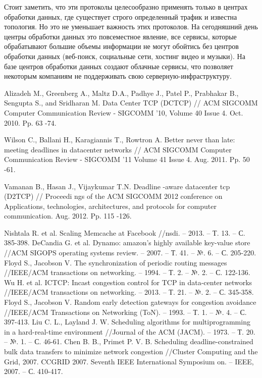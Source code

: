 \documentclass[14pt, a4paper,oneside]{extarticle}
\begin{document}
Стоит заметить, что эти протоколы целесообразно применять только в центрах обработки данных, где существует строго определенный трафик и известна топология. Но это не уменьшает важность этих протоколов. На сегодняшний день центры обработки данных это повсеместное явление, все сервисы, которые обрабатывают большие объемы информации не могут обойтись без центров обработки данных (веб-поиск, социальные сети, хостинг видео и музыки). На базе центров обработки данных создают облачные сервисы, что позволяет некоторым компаниям не поддерживать свою серверную-инфраструктуру.

\newpage
\begin{thebibliography}{9}

Alizadeh M., Greenberg A., Maltz
 D.A., Padhye J., Patel P., Prabhakar B., 
Sengupta S., and Sridharan M. Data Center TCP (DCTCP) // ACM SIGCOMM 
Computer Communication Review -
 SIGCOMM '10, Volume 40 Issue 4. Oct. 
2010. Pp. 63
-74.

Wilson C., Ballani H., Karagiannis T., Rowtron
 A. Better never than late: meeting 
deadlines in datacenter networks // ACM SIGCOMM Computer Communication 
Review 
- SIGCOMM '11 Volume 41 Issue 4. Aug. 2011. Pp. 50
-61. 

Vamanan B., Hasan J., Vijaykumar T.N. Deadline
-aware datacenter tcp (D2TCP) 
// Proceedi
ngs of the ACM SIGCOMM 2012 conference on Applications, 
technologies, architectures, and protocols for computer communication. Aug. 
2012. Pp. 115
-126. 

Nishtala R. et al. Scaling Memcache at Facebook //nsdi. – 2013. – Т. 13. – С. 385-398.
DeCandia G. et al. Dynamo: amazon's highly available key-value store //ACM SIGOPS operating systems review. – 2007. – Т. 41. – №. 6. – С. 205-220.
Floyd S., Jacobson V. The synchronization of periodic routing messages //IEEE/ACM transactions on networking. – 1994. – Т. 2. – №. 2. – С. 122-136.
Wu H. et al. ICTCP: Incast congestion control for TCP in data-center networks //IEEE/ACM transactions on networking. – 2013. – Т. 21. – №. 2. – С. 345-358.
Floyd S., Jacobson V. Random early detection gateways for congestion avoidance //IEEE/ACM Transactions on Networking (ToN). – 1993. – Т. 1. – №. 4. – С. 397-413.
Liu C. L., Layland J. W. Scheduling algorithms for multiprogramming in a hard-real-time environment //Journal of the ACM (JACM). – 1973. – Т. 20. – №. 1. – С. 46-61.
Chen B. B., Primet P. V. B. Scheduling deadline-constrained bulk data transfers to minimize network congestion //Cluster Computing and the Grid, 2007. CCGRID 2007. Seventh IEEE International Symposium on. – IEEE, 2007. – С. 410-417.

\end{thebibliography}
\end{document}
